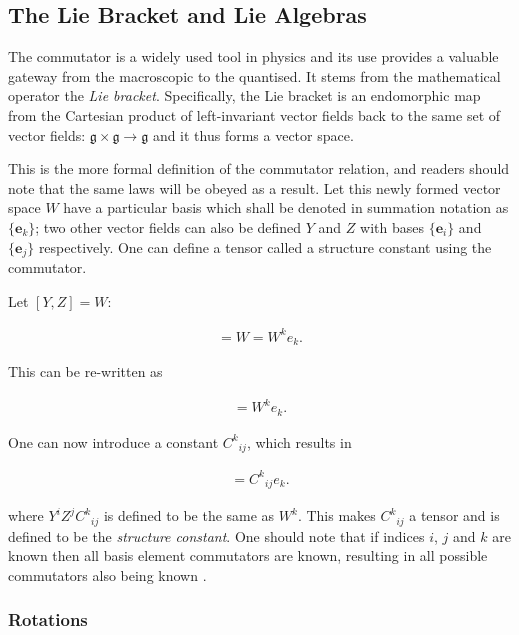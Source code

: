\documentclass[fleqn, twocolumn, 10pt]{article}
\begin{document}
\subsection{The Lie Bracket and Lie Algebras}

The commutator is a widely used tool in physics and its use provides a valuable gateway from the macroscopic to the quantised. It stems from the mathematical operator the \textit{Lie bracket}. Specifically, the Lie bracket is an endomorphic map from the Cartesian product of left-invariant vector fields back to the same set of vector fields: $\mathfrak{g} \times \mathfrak{g} \to \mathfrak{g}$ and it thus forms a vector space. 

This is the more formal definition of the commutator relation, and readers should note that the same laws will be obeyed as a result. Let this newly formed vector space $W$ have a particular basis which shall be denoted in summation notation as $\{\bm{e}_k\}$; two other vector fields can also be defined $Y$ and $Z$ with bases $\{\bm{e}_i\}$ and $\{\bm{e}_j\}$ respectively. One can define a tensor called a structure constant using the commutator. 

Let $[Y, Z] = W$:

\begin{ceqn}
\begin{align*}
[Y, Z] = W = W^ke_k.
\end{align*}
\end{ceqn}
This can be re-written as 

\begin{ceqn}
\begin{align*}
[Y^ie_i, Z^je_j] = W^ke_k.
\end{align*}
\end{ceqn}
One can now introduce a constant $C^k{}_{ij}$, which results in

\begin{ceqn}
\begin{align*}
[e_i, e_j] = C^k{}_{ij}e_k.
\end{align*}
\end{ceqn}
where $Y^iZ^jC^k{}_{ij}$ is defined to be the same as $W^k$. This makes $C^k{}_{ij}$ a tensor and is defined to be the \textit{structure constant}. One should note that if indices $i$, $j$ and $k$ are known then all basis element commutators are known, resulting in all possible commutators also being known \cite{nakahara2003geometry, b2001russell, schwartz2014quantum, robert2007gilmore}.

\subsubsection{Rotations}
\end{document}

